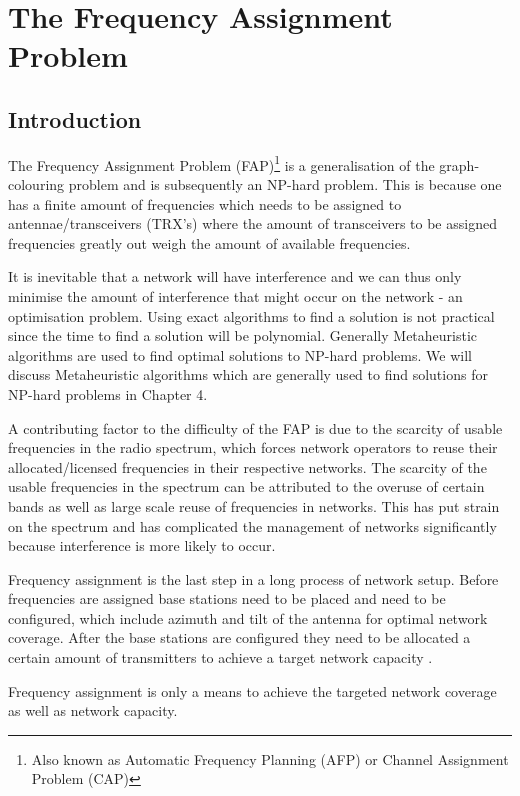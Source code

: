 \chapter{The Frequency Assignment Problem}
\section{Introduction}
The Frequency Assignment Problem (FAP)\footnote{Also known as Automatic Frequency Planning (AFP) or Channel Assignment Problem (CAP)\cite{ACOvsEA}} is a generalisation of the graph-colouring problem and is subsequently an NP-hard problem. This is because one has a finite amount of frequencies which needs to be assigned to antennae/transceivers (TRX's)  where the amount of transceivers to be assigned frequencies greatly out weigh the amount of available frequencies.

It is inevitable that a network will have interference and we can thus only minimise the amount of interference that might occur on the network - an optimisation problem. Using exact algorithms to find a solution is not practical since the time to find a solution will be polynomial. Generally Metaheuristic algorithms are used to find optimal solutions to NP-hard problems\cite{ACOvsEA}. We will discuss Metaheuristic algorithms which are generally used to find solutions for NP-hard problems in Chapter 4. 

A contributing factor to the difficulty of the FAP is due to the scarcity of usable frequencies in the radio spectrum, which forces network operators to reuse their allocated/licensed frequencies in their respective networks. The scarcity of the usable frequencies in the spectrum can be attributed to the overuse of certain bands as well as large scale reuse of frequencies in networks. This has put strain on the spectrum and has complicated the management of networks significantly because interference is more likely to occur.

Frequency assignment is the last step in a long process of network setup. Before frequencies are assigned base stations need to be placed and need to be configured, which include azimuth and tilt of the antenna for optimal network coverage. After the base stations are configured they need to be allocated a certain amount of transmitters to achieve a target network capacity \cite{AndreasPaper}.

Frequency assignment is only a means to achieve the targeted network coverage as well as network capacity.

